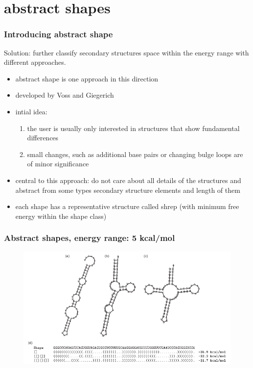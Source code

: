 \documentclass[ignorenonframetext,10pt]{beamer}
\begin{document}
\section{abstract shapes}
\begin{frame}
\frametitle{Introducing abstract shape}
    Solution: further classify secondary structures space within the energy range with different approaches.
    \begin{itemize} 
    \item abstract shape is one approach in this direction
    \item developed by Voss and Giegerich
    \item intial idea:
    \begin{enumerate}
      \item the user is usually only interested in structures that show fundamental differences
      \item small changes, such as additional base pairs or changing bulge loops are of minor significance
    \end{enumerate}
    \item central to this approach: do not care about all details of the structures and abstract from some types secondary structure elements and length of them
    \item each shape has a representative structure called shrep (with minimum free energy within the shape class)
    \end{itemize}
\end{frame}


\begin{frame}
\frametitle{Abstract shapes, energy range: 5 kcal/mol}  
\begin{figure}
  \includegraphics[scale=0.6]{images/shapes_example.jpg} 
\end{figure}
\end{frame}
\end{document}
